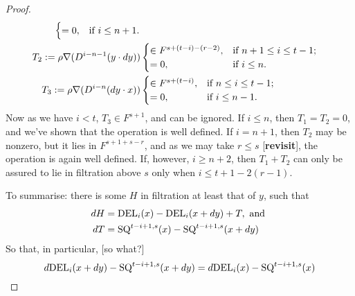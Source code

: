 \documentclass[11pt]{amsart}
\theoremstyle{plain}
\theoremstyle{definition}
\theoremstyle{plain}
\newcommand{\twist}{\omega}
\newcommand{\Nabla}{\nabla}
\begin{document}
\begin{second quadrant homotopy}
\begin{proof}
\begin{align*}
\begin{cases}
=0,&\textup{if }i\leq n+1.
\end{cases}
\\
T_2:=\rho\Nabla(D^{i-n-1}(y\cdot dy))&\begin{cases}
\in F^{s+(t-i)-(r-2)},&\textup{if }n+1\leq i\leq t-1;\\
=0,&\textup{if }i\leq n.
\end{cases}
\\
T_3:=\rho\Nabla(D^{i-n}(dy\cdot x))&\begin{cases}
\in F^{s+(t-i)},&\textup{if }n\leq i\leq t-1;\\
=0,&\textup{if }i\leq n-1.
\end{cases}
\end{align*}
Now as we have $i<t$, $T_3\in F^{s+1}$, and can be ignored. If $i\leq n$, then $T_1=T_2=0$, and we've shown that the operation is well defined. If $i=n+1$, then $T_2$ may be nonzero, but it lies in $F^{s+1+s-r}$, and as we may take $r\leq s$ [\textbf{revisit}], the operation is again well defined.
If, however, $i\geq n+2$, then $T_1+T_2$  can only be assured to lie in filtration above $s$ only when $i\leq t+1-2(r-1)$.

To summarise: there is some $H$ in filtration at least that of $y$, such that
\begin{alignat*}{2}
dH
&=
\textup{DEL}_i(x)-\textup{DEL}_i(x+dy)+T, \textup{ and }%
\\
dT
&=
\textup{SQ}^{t-i+1,s}(x)-\textup{SQ}^{t-i+1,s}(x+dy)
\end{alignat*}
So that, in particular, [so what?]
\[d\textup{DEL}_i(x+dy)-\textup{SQ}^{t-i+1,s}(x+dy)=d\textup{DEL}_i(x)-\textup{SQ}^{t-i+1,s}(x)\qedhere\]
\end{proof}


\end{second quadrant homotopy}
\end{document}

